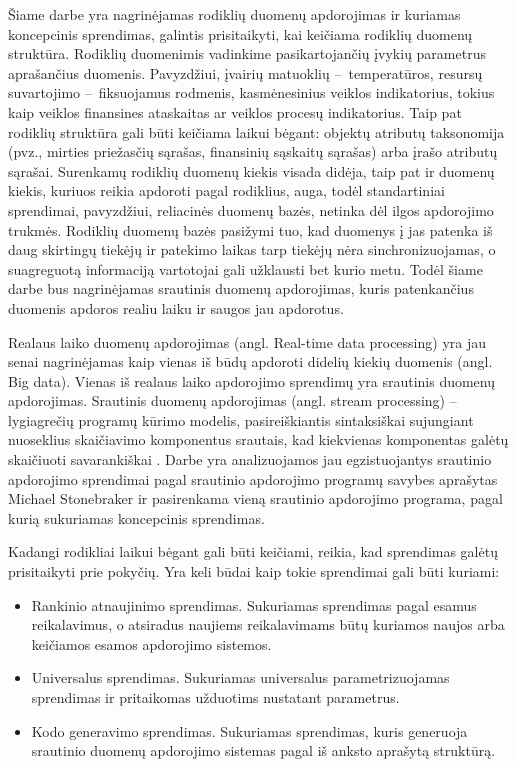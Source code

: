 \documentclass{VUMIFPSbakalaurinis}
\begin{document}
\tableofcontents

 
Šiame darbe yra nagrinėjamas rodiklių duomenų apdorojimas ir kuriamas koncepcinis sprendimas, galintis prisitaikyti, kai keičiama rodiklių duomenų struktūra. Rodiklių duomenimis vadinkime pasikartojančių įvykių parametrus aprašančius duomenis. Pavyzdžiui, įvairių matuoklių – temperatūros, resursų suvartojimo – fiksuojamus rodmenis, kasmėnesinius veiklos indikatorius, tokius kaip veiklos finansines ataskaitas ar veiklos procesų indikatorius. Taip pat rodiklių struktūra gali būti keičiama laikui bėgant: objektų atributų taksonomija (pvz., mirties priežasčių sąrašas, finansinių sąskaitų sąrašas) arba įrašo atributų sąrašai. Surenkamų rodiklių duomenų kiekis visada didėja, taip pat ir duomenų kiekis, kuriuos reikia apdoroti pagal rodiklius, auga, todėl standartiniai sprendimai, pavyzdžiui, reliacinės duomenų bazės, netinka dėl ilgos apdorojimo trukmės. Rodiklių duomenų bazės pasižymi tuo, kad duomenys į jas patenka iš daug skirtingų tiekėjų ir patekimo laikas tarp tiekėjų nėra sinchronizuojamas, o suagreguotą informaciją vartotojai gali užklausti bet kurio metu. Todėl šiame darbe bus nagrinėjamas srautinis duomenų apdorojimas, kuris patenkančius duomenis apdoros realiu laiku ir saugos jau apdorotus. \par
Realaus laiko duomenų apdorojimas (angl. Real-time data processing) yra jau senai nagrinėjamas kaip vienas iš būdų apdoroti didelių kiekių duomenis (angl. Big data). Vienas iš realaus laiko apdorojimo sprendimų yra srautinis duomenų apdorojimas. Srautinis duomenų apdorojimas (angl. stream processing) – lygiagrečių programų kūrimo modelis, pasireiškiantis sintaksiškai sujungiant nuoseklius skaičiavimo komponentus srautais, kad kiekvienas komponentas galėtų skaičiuoti savarankiškai \cite{shortstreamproc}. Darbe yra analizuojamos jau egzistuojantys srautinio apdorojimo sprendimai pagal srautinio apdorojimo programų savybes aprašytas Michael Stonebraker ir pasirenkama vieną srautinio apdorojimo programa, pagal kurią sukuriamas koncepcinis sprendimas. 
\par
Kadangi rodikliai laikui bėgant gali būti keičiami, reikia, kad sprendimas galėtų prisitaikyti prie pokyčių. Yra keli būdai kaip tokie sprendimai gali būti kuriami:
\begin{itemize}
    \item Rankinio atnaujinimo sprendimas. Sukuriamas sprendimas pagal esamus reikalavimus, o atsiradus naujiems reikalavimams būtų kuriamos naujos arba keičiamos esamos apdorojimo sistemos. 
    \item Universalus sprendimas. Sukuriamas universalus parametrizuojamas sprendimas ir pritaikomas užduotims nustatant parametrus.
    \item Kodo generavimo sprendimas. Sukuriamas sprendimas, kuris generuoja srautinio duomenų apdorojimo sistemas pagal iš anksto aprašytą struktūrą.  
\end{itemize}   
\end{document}
